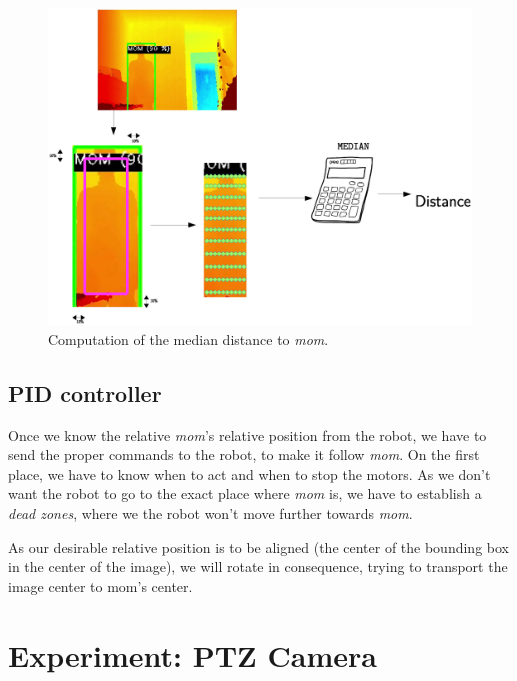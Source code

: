 \begin{itemize}
			
			\begin{figure}[h]
				\centering
				\includegraphics[width=6in]{images/distance_error}
				\caption{Computation of the median distance to \emph{mom}.}
				\label{fig:6_distance_to_mom}
			\end{figure}
		\end{itemize}
	
	
	
	\subsection{PID controller}
		Once we know the relative \emph{mom}'s relative position from the robot, we have to send the proper commands to the robot, to make it follow \emph{mom}. On the first place, we have to know when to act and when to stop the motors. As we don't want the robot to go to the exact place where \emph{mom} is, we have to establish a \emph{dead zones}, where we the robot won't move further towards \emph{mom}.
	
	
	
	
	As our desirable relative position is to be aligned (the center of the bounding box in the center of the image), we will rotate in consequence, trying to transport the image center to mom's center.
\section{Experiment: PTZ Camera}
\label{sec:follow_ptz}
